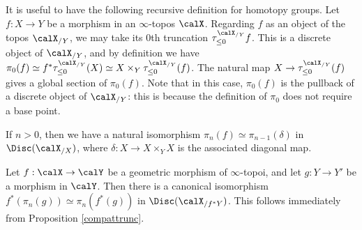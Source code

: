 \begin{remark}\label{recgroup}
It is useful to have the following recursive definition for homotopy groups.
Let $f: X \rightarrow Y$ be a morphism in an $\infty$-topos $\calX$. 
Regarding $f$ as an object of the topos
$\calX_{/Y}$, we may take its $0$th truncation
$\tau_{\leq 0}^{\calX_{/Y}} f$. This is a discrete object of $\calX_{/Y}$, and by definition
we have $\pi_0(f) \simeq f^{\ast} \tau_{\leq 0}^{\calX_{/Y}}(X) \simeq
X \times_{Y} \tau_{\leq 0}^{\calX_{/Y}}(f)$. The natural map $X
\rightarrow \tau_{\leq 0}^{\calX_{/Y}}(f)$ gives a global section of
$\pi_0(f)$. Note that in this case, $\pi_0(f)$ is the pullback of
a discrete object of $\calX_{/Y}$: this is because the definition of $\pi_0$ does not
require a base point. 

If $n >0$, then we have a natural isomorphism $\pi_{n}(f) \simeq
\pi_{n-1}(\delta)$ in $\Disc(\calX_{/X})$, where $\delta: X \rightarrow X \times_{Y} X$ is the associated diagonal map. \end{remark}

\begin{remark}\label{emmy}
Let $f: \calX \rightarrow \calY$ be a geometric morphism of
$\infty$-topoi, and let $g: Y \rightarrow Y'$ be a morphism in
$\calY$. Then there is a canonical isomorphism $f^{\ast}( \pi_n(g) ) \simeq \pi_n(f^{\ast}(g))$
in $\Disc(\calX_{/f^{\ast} Y})$. This follows immediately from Proposition \ref{compattrunc}.
\end{remark}

